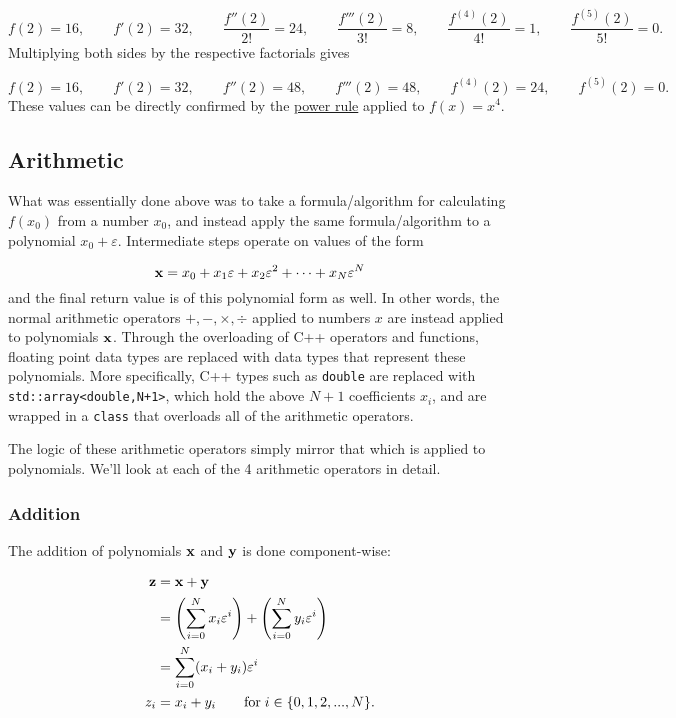 \documentclass{article}
\begin{document}
\[
f(2) = 16, \qquad
f'(2) = 32, \qquad
\frac{f''(2)}{2!} = 24, \qquad
\frac{f'''(2)}{3!} = 8, \qquad
\frac{f^{(4)}(2)}{4!} = 1, \qquad
\frac{f^{(5)}(2)}{5!} = 0.
\]
Multiplying both sides by the respective factorials gives

\[
f(2) = 16, \qquad
f'(2) = 32, \qquad
f''(2) = 48, \qquad
f'''(2) = 48, \qquad
f^{(4)}(2) = 24, \qquad
f^{(5)}(2) = 0.
\]
These values can be directly confirmed by the \href{https://en.wikipedia.org/wiki/Power_rule}{power rule}
applied to $f(x)=x^4$.

\subsection{Arithmetic}

What was essentially done above was to take a formula/algorithm for calculating $f(x_0)$ from a number $x_0$,
and instead apply the same formula/algorithm to a polynomial $x_0+\varepsilon$. Intermediate steps operate on
values of the form

\[
{\bf x} = x_0 + x_1\varepsilon + x_2\varepsilon^2 +\cdots+ x_N\varepsilon^N
\]
and the final return value is of this polynomial form as well. In other words, the normal arithmetic operators
$+,-,\times,\div$ applied to numbers $x$ are instead applied to polynomials $\bf x$. Through the overloading of C++
operators and functions, floating point data types are replaced with data types that represent these polynomials. More
specifically, C++ types such as {\tt double} are replaced with {\tt std::array<double,N+1>}, which hold the above
$N+1$ coefficients $x_i$, and are wrapped in a {\tt class} that overloads all of the arithmetic operators.

The logic of these arithmetic operators simply mirror that which is applied to polynomials. We'll look at
each of the 4 arithmetic operators in detail.

\subsubsection{Addition}

The addition of polynomials $\bf x$ and $\bf y$ is done component-wise:

\begin{align*}
{\bf z} &= {\bf x} + {\bf y} \\
 &= \left(\sum_{i=0}^Nx_i\varepsilon^i\right) + \left(\sum_{i=0}^Ny_i\varepsilon^i\right) \\
 &= \sum_{i=0}^N(x_i+y_i)\varepsilon^i \\
z_i &= x_i + y_i \qquad \text{for}\; i\in\{0,1,2,...,N\}.
\end{align*}
\end{document}
